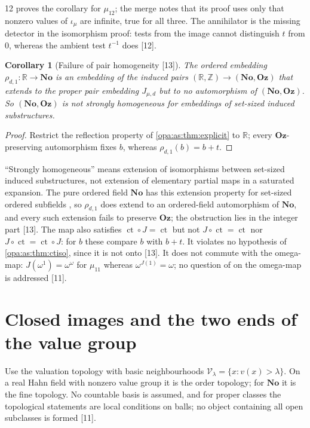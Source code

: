 \documentclass[11pt,oneside]{article}
\numberwithin{equation}{section}
\newtheorem{corollary}[corollary]{Corollary}
\theoremstyle{definition}
\theoremstyle{remark}
\newcommand{\No}{\mathbf{No}}
\newcommand{\Oz}{\mathbf{Oz}}
\newcommand{\R}{\mathbb R}
\newcommand{\Z}{\mathbb Z}
\newcommand{\ct}{\operatorname{ct}}
\newcommand{\src}[1]{\textup{\textsf{\small[#1]}}}
\begin{document}
12 proves the corollary for $\mu_{12}$; the merge notes that its proof uses only that nonzero values of
$\iota_\mu$ are infinite, true for all three. The annihilator is the missing detector in the isomorphism
proof: tests from the image cannot distinguish $t$ from $0$, whereas the ambient test $t^{-1}$ does
\src{12}.

\begin{corollary}[Failure of pair homogeneity \src{13}]\label{opa:as:cor:homogeneity}
The ordered embedding $\rho_{d,1}:\R\to\No$ is an embedding of the induced pairs $(\R,\Z)\to(\No,\Oz)$
that extends to the proper pair embedding $J_{\mu,d}$ but to no automorphism of $(\No,\Oz)$. So
$(\No,\Oz)$ is not strongly homogeneous for embeddings of set-sized induced substructures.
\end{corollary}
\begin{proof}
Restrict the reflection property of \cref{opa:as:thm:explicit} to $\R$; every $\Oz$-preserving automorphism
fixes $b$, whereas $\rho_{d,1}(b)=b+t$.
\end{proof}

``Strongly homogeneous'' means extension of isomorphisms between set-sized induced substructures, not
extension of elementary partial maps in a saturated expansion. The pure ordered field $\No$ has this
extension property for set-sized ordered subfields \cite[Remark 2.10]{KKS}, so $\rho_{d,1}$ does extend to
an ordered-field automorphism of $\No$, and every such extension fails to preserve $\Oz$; the obstruction
lies in the integer part \src{13}. The map also satisfies $\ct\circ J=\ct$ but not $J\circ\ct=\ct$ nor
$J\circ\ct=\ct\circ J$: for $b$ these compare $b$ with $b+t$. It violates no hypothesis of
\cref{opa:as:thm:ctiso}, since it is not onto \src{13}. It does not commute with the omega-map:
$J(\omega^1)=\omega^\omega$ for $\mu_{11}$ whereas $\omega^{J(1)}=\omega$; no question of \cite{KKS} on the
omega-map is addressed \src{11}.

\section{Closed images and the two ends of the value group}\label{opa:as:sec:topology}

Use the valuation topology with basic neighbourhoods $\mathcal V_\lambda=\{x:v(x)>\lambda\}$. On a real Hahn
field with nonzero value group it is the order topology; for $\No$ it is the fine topology. No countable
basis is assumed, and for proper classes the topological statements are local conditions on balls; no
object containing all open subclasses is formed \src{11}.
\end{document}
